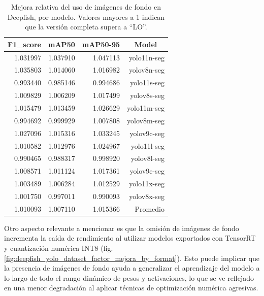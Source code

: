 \begin{table}[htbp]
\centering
\caption[Mejora relativa del uso de imágenes de fondo en Deepfish, por modelo]{Mejora relativa del uso de imágenes de fondo en Deepfish, por modelo. Valores mayores a 1 indican que la versión completa supera a ``LO''.}
\label{tab:deepfish_mejoraRelativa_model}
\begin{tabular}{|r|r|r|r|}
\hline
\multicolumn{1}{|c|}{\textbf{F1\_score}} & \multicolumn{1}{c|}{\textbf{mAP50}} & \multicolumn{1}{c|}{\textbf{mAP50-95}} & \multicolumn{1}{c|}{\textbf{Model}} \\ \hline
1.031997 & 1.037910 & 1.047113 & yolo11n-seg \\ \hline
1.035803 & 1.014060 & 1.016982 & yolov8n-seg \\ \hline
0.993440 & 0.985146 & 0.994686 & yolo11s-seg \\ \hline
1.009829 & 1.006209 & 1.017499 & yolov8s-seg \\ \hline
1.015479 & 1.013459 & 1.026629 & yolo11m-seg \\ \hline
0.994692 & 0.999929 & 1.007808 & yolov8m-seg \\ \hline
1.027096 & 1.015316 & 1.033245 & yolov9c-seg \\ \hline
1.010582 & 1.012976 & 1.024967 & yolo11l-seg \\ \hline
0.990465 & 0.988317 & 0.998920 & yolov8l-seg \\ \hline
1.008571 & 1.011124 & 1.017361 & yolov9e-seg \\ \hline
1.003489 & 1.006284 & 1.012529 & yolo11x-seg \\ \hline
1.001750 & 0.997011 & 0.990093 & yolov8x-seg \\ \hline
1.010093 & 1.007110 & 1.015366 & Promedio \\ \hline
\end{tabular}
\end{table}

Otro aspecto relevante a mencionar es que la omisión de imágenes de fondo incrementa la caída de rendimiento al utilizar modelos exportados con TensorRT y cuantización numérica INT8 (fig. \ref{fig:deepfish_yolo_dataset_factor_mejora_by_format}). Esto puede implicar que la presencia de imágenes de fondo ayuda a generalizar el aprendizaje del modelo a lo largo de todo el rango dinámico de pesos y activaciones, lo que se ve reflejado en una menor degradación al aplicar técnicas de optimización numérica agresivas.

